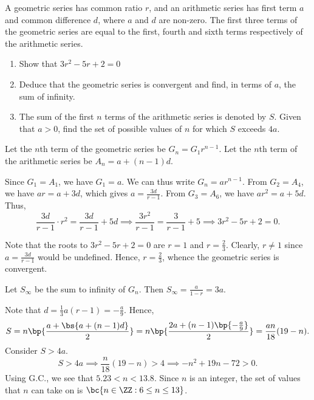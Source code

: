 \begin{problem}
    A geometric series has common ratio $r$, and an arithmetic series has first term $a$ and common difference $d$, where $a$ and $d$ are non-zero. The first three terms of the geometric series are equal to the first, fourth and sixth terms respectively of the arithmetic series.

    \begin{enumerate}
        \item Show that $3r^2 - 5r + 2 = 0$
        \item Deduce that the geometric series is convergent and find, in terms of $a$, the sum of infinity.
        \item The sum of the first $n$ terms of the arithmetic series is denoted by $S$. Given that $a > 0$, find the set of possible values of $n$ for which $S$ exceeds $4a$.
    \end{enumerate}
\end{problem}
\begin{solution}
    \begin{ppart}
        Let the $n$th term of the geometric series be $G_n = G_1r^{n-1}$. Let the $n$th term of the arithmetic series be $A_n = a + (n-1)d$.
        
        Since $G_1 = A_1$, we have $G_1 = a$. We can thus write $G_n = ar^{n-1}$. From $G_2 = A_4$, we have $ar = a + 3d$, which gives $a = \frac{3d}{r-1}$. From $G_3 = A_6$, we have $ar^2 = a + 5d$. Thus, \[\frac{3d}{r-1} \cdot r^2 = \frac{3d}{r-1} + 5d \implies \frac{3r^2}{r-1} = \frac{3}{r-1} + 5 \implies 3r^2 - 5r + 2 = 0.\]
    \end{ppart}
    \begin{ppart}
        Note that the roots to $3r^2 - 5r + 2 = 0$ are $r = 1$ and $r = \frac23$. Clearly, $r \neq 1$ since $a = \frac{3d}{r-1}$ would be undefined. Hence, $r = \frac23$, whence the geometric series is convergent.

        Let $S_\infty$ be the sum to infinity of $G_n$. Then $S_\infty = \frac{a}{1 - r} = 3a$.
    \end{ppart}
    \begin{ppart}
        Note that $d = \frac13 a(r-1) = -\frac{a}9$. Hence, \[S = n \bp{\frac{a + \bs{a + (n-1)d}}{2}} = n \bp{\frac{2a + (n-1)\bp{-\frac{a}9}}{2}} = \frac{an}{18}(19 - n).\] Consider $S > 4a$. \[S > 4a \implies \frac{n}{18} (19 - n) > 4 \implies -n^2 + 19n - 72 > 0.\] Using G.C., we see that  $5.23 < n < 13.8$. Since $n$ is an integer, the set of values that $n$ can take on is $\bc{n \in \ZZ : 6 \leq n \leq 13}$.
    \end{ppart}
\end{solution}

